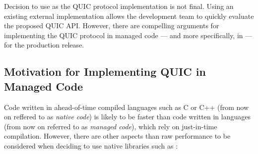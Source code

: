Decision to use \libmsquic{} as the QUIC protocol implementation is not final. Using an existing
external implementation allows the development team to quickly evaluate the proposed QUIC API\@.
However, there are compelling arguments for implementing the QUIC protocol in managed \dotnet{} code
--- and more specifically, in \csharp{} --- for the production release.


\subsection*{Motivation for Implementing QUIC in Managed Code}

Code written in ahead-of-time compiled languages such as C or C++ (from now on reffered to as
\textit{native code}) is likely to be faster than code written in \dotnet{} languages (from now on
referred to as \textit{managed code}), which rely on just-in-time compilation. However, there are
other aspects than raw performance to be considered when deciding to use native libraries such as
\libmsquic{}:


